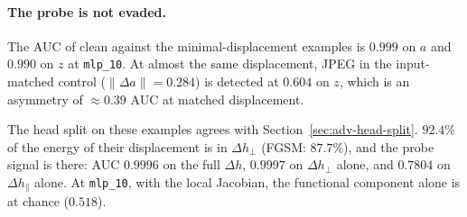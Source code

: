 \documentclass[../ppgc-tese.tex]{subfiles}
\begin{document}
\paragraph*{The probe is not evaded.}
The AUC of clean against the minimal-displacement examples is $0.999$ on $a$
and $0.990$ on $z$ at \texttt{mlp\_10}.
At almost the same displacement, JPEG in the input-matched control
($\lVert\Delta a\rVert = 0.284$) is detected at $0.604$ on $z$, which is an
asymmetry of $\approx 0.39$ AUC at matched displacement.

The head split on these examples agrees with
Section~\ref{sec:adv-head-split}. $92.4\%$ of the energy of their displacement
is in $\Delta h_{\perp}$ (FGSM: $87.7\%$), and the probe signal is there: AUC
$0.9996$ on the full $\Delta h$, $0.9997$ on $\Delta h_{\perp}$ alone, and
$0.7804$ on $\Delta h_{\parallel}$ alone. At \texttt{mlp\_10}, with the local
Jacobian, the functional component alone is at chance ($0.518$).
\end{document}

